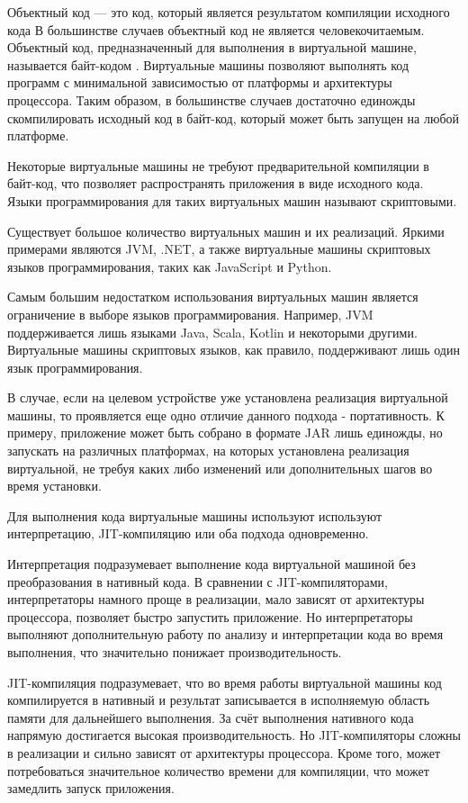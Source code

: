 Объектный код — это код, который является результатом компиляции исходного кода
В большинстве случаев объектный код не является человекочитаемым.
Объектный код, предназначенный для выполнения в виртуальной машине, называется байт-кодом \cite{BytecodeDefentition}.
Виртуальные машины позволяют выполнять код программ с минимальной зависимостью от платформы и архитектуры процессора.
Таким образом, в большинстве случаев достаточно единожды скомпилировать исходный код в байт-код, который может быть запущен на любой платформе.

Некоторые виртуальные машины не требуют предварительной компиляции в байт-код, что позволяет распространять приложения в виде исходного кода.
Языки программирования для таких виртуальных машин называют скриптовыми.

Существует большое количество виртуальных машин и их реализаций.
Яркими примерами являются JVM, .NET, а также виртуальные машины скриптовых языков программирования, таких как JavaScript и Python.

Самым большим недостатком использования виртуальных машин является ограничение в выборе языков программирования. 
Например, JVM поддерживается лишь языками Java, Scala, Kotlin и некоторыми другими. 
Виртуальные машины скриптовых языков, как правило, поддерживают лишь один язык программирования.

В случае, если на целевом устройстве уже установлена реализация виртуальной машины, то проявляется еще одно отличие данного подхода - портативность. 
К примеру, приложение может быть собрано в формате JAR лишь единожды, но запускать на различных платформах, на которых установлена реализация виртуальной, не требуя каких либо изменений или дополнительных шагов во время установки.

Для выполнения кода виртуальные машины используют используют интерпретацию, JIT-компиляцию или оба подхода одновременно.

Интерпретация подразумевает выполнение кода виртуальной машиной без преобразования в нативный кода. 
В сравнении с JIT-компиляторами, интерпретаторы намного проще в реализации, мало зависят от архитектуры процессора, позволяет быстро запустить приложение.
Но интерпретаторы выполняют дополнительную работу по анализу и интерпретации кода во время выполнения, что значительно понижает производительность.

JIT-компиляция подразумевает, что во время работы виртуальной машины код компилируется в нативный и результат записывается в исполняемую область памяти для дальнейшего выполнения.
За счёт выполнения нативного кода напрямую достигается высокая производительность.
Но JIT-компиляторы сложны в реализации и сильно зависят от архитектуры процессора.
Кроме того, может потребоваться значительное количество времени для компиляции, что может замедлить запуск приложения.

